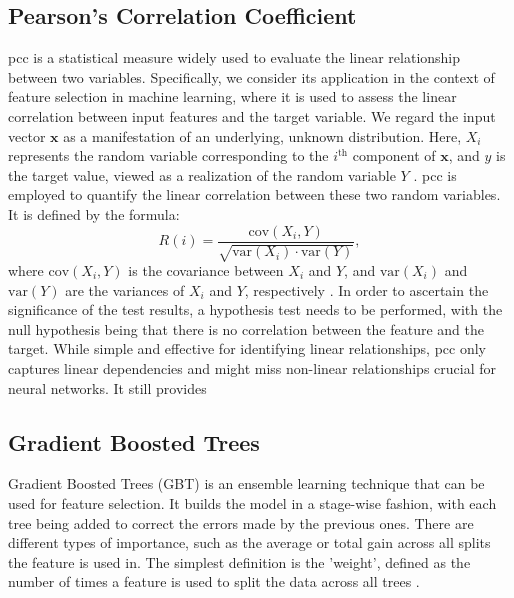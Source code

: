 \documentclass[12pt, a4paper, headinclude, twoside, plainheadsepline, open=right, numbers=noenddot, hidelinks, toc=listof, toc=bibliography]{scrreprt}
\begin{document}
\subsection{Pearson's Correlation Coefficient}
\label{ssec:pearsons}
\Ac{pcc} is a statistical measure widely used to evaluate the linear relationship between two variables. 
Specifically, we consider its application in the context of feature selection in machine learning, where it is used to assess the linear correlation between input features and the target variable. 
We regard the input vector $\mathbf{x}$ as a manifestation of an underlying, unknown distribution. 
Here, $X_i$ represents the random variable corresponding to the $i^{\text{th}}$ component of $\mathbf{x}$, and $y$ is the target value, viewed as a realization of the random variable $Y$ \cite{guyonIntroductionVariableFeature}. 
\Ac{pcc} is employed to quantify the linear correlation between these two random variables. It is defined by the formula:
\begin{equation}
R(i) = \frac{\text{cov}(X_i, Y)}{\sqrt{\text{var}(X_i) \cdot \text{var}(Y)}},
\end{equation}
where $\text{cov}(X_i, Y)$ is the covariance between $X_i$ and $Y$, and $\text{var}(X_i)$ and $\text{var}(Y)$ are the variances of $X_i$ and $Y$, respectively \cite{chandrashekarSurveyFeatureSelection2014}.
In order to ascertain the significance of the test results, a hypothesis test needs to be performed, with the null hypothesis being that there is no correlation between the feature and the target.
While simple and effective for identifying linear relationships, \ac{pcc} only captures linear dependencies and might miss non-linear relationships crucial for neural networks.
It still provides 


\subsection{Gradient Boosted Trees}
\label{ssec:gbt}

Gradient Boosted Trees (GBT) is an ensemble learning technique that can be used for feature selection. It builds the model in a stage-wise fashion, with each tree being added to correct the errors made by the previous ones. 
There are different types of importance, such as the average or total gain across all splits the feature is used in.
The simplest definition is the 'weight', defined as the number of times a feature is used to split the data across all trees \cite{chenXGBoostScalableTree2016}.
\end{document}
